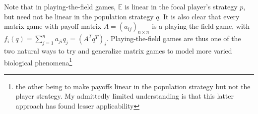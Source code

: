 \\
\\
Note that in playing-the-field games, $\mathbb{E}$ is linear in the focal player's strategy $p$, but need not be linear in the population strategy $q$. It is also clear that every matrix game with payoff matrix $A = (a_{ij})_{n\times n}$ is a playing-the-field game, with $f_i(q) = \sum\limits_{j=1}^{n}a_{ji}q_j = (A^Tq^T)_i$. Playing-the-field games are thus one of the two natural ways to try and generalize matrix games to model more varied biological phenomena\footnote{the other being to make payoffs linear in the population strategy but not the player strategy. My admittedly limited understanding is that this latter approach has found lesser applicability}

